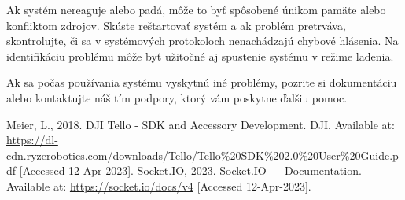 \documentclass[a4paper]{feidipsp}
\begin{document}
Ak systém nereaguje alebo padá, môže to byť spôsobené únikom pamäte alebo konfliktom zdrojov. Skúste reštartovať systém a ak problém pretrváva, skontrolujte, či sa v systémových protokoloch nenachádzajú chybové hlásenia. Na identifikáciu problému môže byť užitočné aj spustenie systému v režime ladenia.

Ak sa počas používania systému vyskytnú iné problémy, pozrite si dokumentáciu alebo kontaktujte náš tím podpory, ktorý vám poskytne ďalšiu pomoc.

\newpage
\begin{flushleft}

\def\refname{Zoznam použitej literatúry}

\begin{thebibliography}{999}
     Meier, L., 2018. DJI Tello - SDK and Accessory Development. DJI. Available at: \url{https://dl-cdn.ryzerobotics.com/downloads/Tello/Tello\%20SDK\%202.0\%20User\%20Guide.pdf} [Accessed 12-Apr-2023].
     Socket.IO, 2023. Socket.IO — Documentation. Available at: \url{https://socket.io/docs/v4} [Accessed 12-Apr-2023].
\end{thebibliography}

\end{flushleft}








 
%   
% 
% 
% 
% 
% 



 
\end{document}
